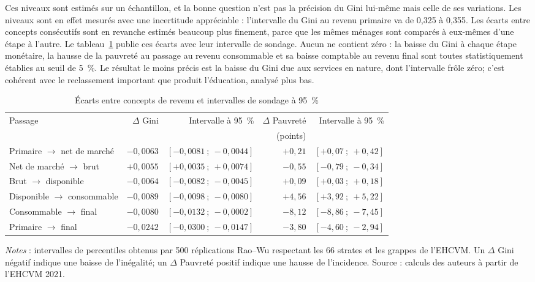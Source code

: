 \documentclass[11pt,a4paper]{article}
\begin{document}
Ces niveaux sont estimés sur un échantillon, et la bonne question n'est pas la
précision du Gini lui-même mais celle de ses variations. Les niveaux sont en
effet mesurés avec une incertitude appréciable : l'intervalle du Gini au revenu
primaire va de 0,325 à 0,355. Les écarts entre concepts consécutifs sont en
revanche estimés beaucoup plus finement, parce que les mêmes ménages sont
comparés à eux-mêmes d'une étape à l'autre. Le tableau~\ref{tab:concepts-inference}
publie ces écarts avec leur intervalle de sondage. Aucun ne contient zéro : la
baisse du Gini à chaque étape monétaire, la hausse de la pauvreté au passage au
revenu consommable et sa baisse comptable au revenu final sont toutes
statistiquement établies au seuil de 5~\%. Le résultat le moins précis est la
baisse du Gini due aux services en nature, dont l'intervalle frôle zéro; c'est
cohérent avec le reclassement important que produit l'éducation, analysé plus
bas.

\begin{table}[t]
\centering
\begin{threeparttable}
\caption{Écarts entre concepts de revenu et intervalles de sondage à 95~\%}
\label{tab:concepts-inference}
\small
\begin{tabular}{lrrrr}
\toprule
Passage & $\Delta$ Gini & Intervalle à 95~\% & $\Delta$ Pauvreté & Intervalle à 95~\% \\
        &               &                    & (points)          &                    \\
\midrule
Primaire $\to$ net de marché   & $-0{,}0063$ & $[-0{,}0081\ ;\ -0{,}0044]$ & $+0{,}21$ & $[+0{,}07\ ;\ +0{,}42]$ \\
Net de marché $\to$ brut       & $+0{,}0055$ & $[+0{,}0035\ ;\ +0{,}0074]$ & $-0{,}55$ & $[-0{,}79\ ;\ -0{,}34]$ \\
Brut $\to$ disponible          & $-0{,}0064$ & $[-0{,}0082\ ;\ -0{,}0045]$ & $+0{,}09$ & $[+0{,}03\ ;\ +0{,}18]$ \\
Disponible $\to$ consommable   & $-0{,}0089$ & $[-0{,}0098\ ;\ -0{,}0080]$ & $+4{,}56$ & $[+3{,}92\ ;\ +5{,}22]$ \\
Consommable $\to$ final        & $-0{,}0080$ & $[-0{,}0132\ ;\ -0{,}0002]$ & $-8{,}12$ & $[-8{,}86\ ;\ -7{,}45]$ \\
\midrule
Primaire $\to$ final           & $-0{,}0242$ & $[-0{,}0300\ ;\ -0{,}0147]$ & $-3{,}80$ & $[-4{,}60\ ;\ -2{,}94]$ \\
\bottomrule
\end{tabular}
\begin{tablenotes}\footnotesize
\item \emph{Notes} : intervalles de percentiles obtenus par 500 réplications
Rao--Wu respectant les 66 strates et les grappes de l'EHCVM. Un $\Delta$ Gini
négatif indique une baisse de l'inégalité; un $\Delta$ Pauvreté positif indique
une hausse de l'incidence. Source : calculs des auteurs à partir de l'EHCVM 2021.
\end{tablenotes}
\end{threeparttable}
\end{table}
\end{document}
